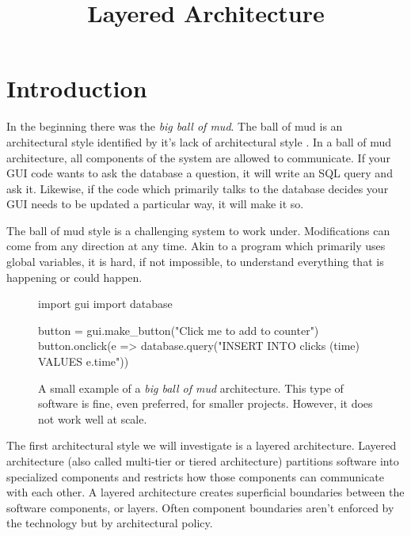 \title{Layered Architecture}
\maketitle

\section{Introduction}
In the beginning there was the \textsl{big ball of mud}.
The ball of mud is an architectural style identified by it's lack of architectural style \cite{ballofmud}.
In a ball of mud architecture, all components of the system are allowed to communicate.
If your GUI code wants to ask the database a question, it will write an SQL query and ask it.
Likewise, if the code which primarily talks to the database decides your GUI needs to be updated a particular way, it will make it so.

The ball of mud style is a challenging system to work under.
Modifications can come from any direction at any time.
Akin to a program which primarily uses global variables,
it is hard, if not impossible,
to understand everything that is happening or could happen.


\begin{figure}[ht]
\begin{code}[style=python]
import gui
import database

button = gui.make_button("Click me to add to counter")
button.onclick(e => 
    database.query("INSERT INTO clicks (time) VALUES {{e.time}}"))
\end{code}
\caption{
A small example of a \textsl{big ball of mud} architecture.
This type of software is fine, even preferred, for smaller projects.
However, it does not work well at scale.
}
\end{figure}

The first architectural style we will investigate is a layered architecture.
Layered architecture (also called multi-tier or tiered architecture) 
partitions software into specialized components and restricts how those components can communicate with each other.
A layered architecture creates superficial boundaries between the software components, or layers.
Often component boundaries aren't enforced by the technology but by architectural policy.


